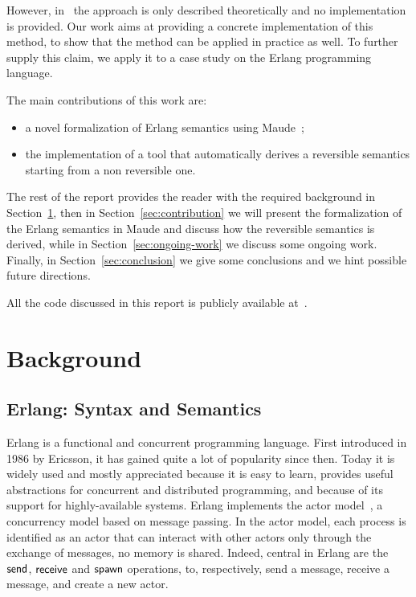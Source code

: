 \documentclass{article}[12pt,a4paper]
\theoremstyle{definition}
\begin{document}
However, in~\cite{LaneseM20} the approach is only described
theoretically and no implementation is provided. Our work aims at
providing a concrete implementation of this method, to show that the
method can be applied in practice as well.  To further supply this
claim, we apply it to a case study on the Erlang programming language.

The main contributions of this work are:
\begin{itemize}
  \item a novel formalization of Erlang semantics using
    Maude~\cite{maude};
  \item the implementation of a tool that automatically derives a reversible
    semantics starting from a non reversible one.
\end{itemize}

The rest of the report provides the reader with the required
background in Section~\ref{sec:background}, then in
Section~\ref{sec:contribution} we will present the formalization of
the Erlang semantics in Maude and discuss how the reversible semantics
is derived, while in Section~\ref{sec:ongoing-work} we discuss some
ongoing work. Finally, in Section~\ref{sec:conclusion} we give some
conclusions and we hint possible future directions.

All the code discussed in this report is publicly available
at~\cite{erl-maude-repo}. 

\section{Background}\label{sec:background}

\subsection{Erlang: Syntax and Semantics}

Erlang is a functional and concurrent programming language. First
introduced in 1986 by Ericsson, it has gained quite a lot of
popularity since then.  Today it is widely used and mostly appreciated
because it is easy to learn, provides useful abstractions for
concurrent and distributed programming, and because of its support for
highly-available systems. Erlang implements the actor model~\cite{Hewitt73}, a
concurrency model based on message passing. In the actor model, each
process is identified as an actor that can interact with other actors
only through the exchange of messages, no memory is shared. Indeed,
central in Erlang are the $\mathsf{send}$, $\mathsf{receive}$ and $\mathsf{spawn}$
operations, to, respectively, send a message, receive a message, and
create a new actor.
\end{document}
